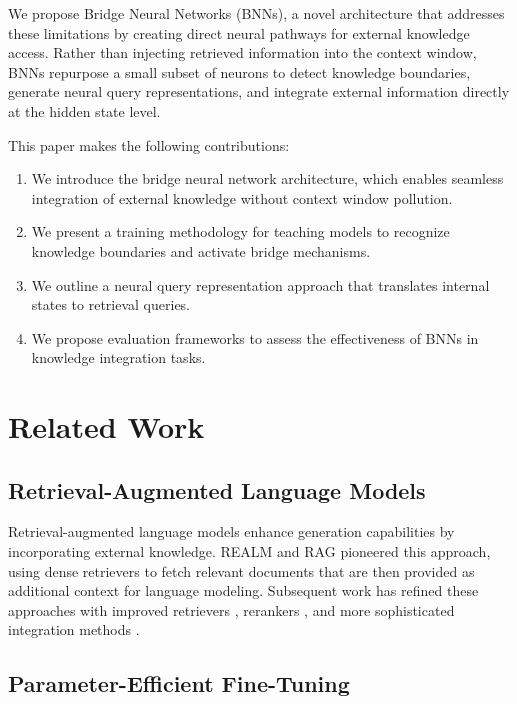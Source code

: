\documentclass[9pt,a4paper,twocolumn,twoside]{tau-class/tau}
\begin{document}
    We propose Bridge Neural Networks (BNNs), a novel architecture that addresses these limitations by creating direct neural pathways for external knowledge access. Rather than injecting retrieved information into the context window, BNNs repurpose a small subset of neurons to detect knowledge boundaries, generate neural query representations, and integrate external information directly at the hidden state level.

    This paper makes the following contributions:
    \begin{enumerate}
        \item We introduce the bridge neural network architecture, which enables seamless integration of external knowledge without context window pollution.
        \item We present a training methodology for teaching models to recognize knowledge boundaries and activate bridge mechanisms.
        \item We outline a neural query representation approach that translates internal states to retrieval queries.
        \item We propose evaluation frameworks to assess the effectiveness of BNNs in knowledge integration tasks.
    \end{enumerate}

\section{Related Work}

\subsection{Retrieval-Augmented Language Models}

    Retrieval-augmented language models enhance generation capabilities by incorporating external knowledge. REALM \cite{guu2020realm} and RAG \cite{lewis2020retrieval} pioneered this approach, using dense retrievers to fetch relevant documents that are then provided as additional context for language modeling. Subsequent work has refined these approaches with improved retrievers \cite{karpukhin2020dense}, rerankers \cite{nogueira2019passage}, and more sophisticated integration methods \cite{izacard2021leveraging}.

\subsection{Parameter-Efficient Fine-Tuning}
\end{document}
